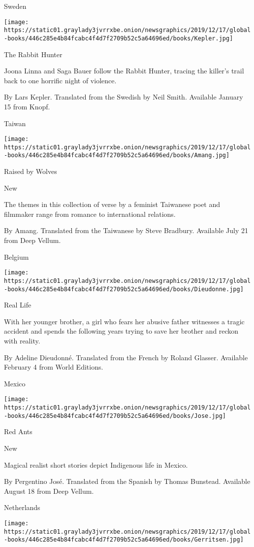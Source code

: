 Sweden

\texttt{[image: https://static01.graylady3jvrrxbe.onion/newsgraphics/2019/12/17/global-books/446c285e4b84fcabc4f4d7f2709b52c5a64696ed/books/Kepler.jpg]}

The Rabbit Hunter

Joona Linna and Saga Bauer follow the Rabbit Hunter, tracing the
killer's trail back to one horrific night of violence.

 By Lars Kepler. Translated from the Swedish by Neil Smith. Available
January 15 from Knopf.

Taiwan

\texttt{[image: https://static01.graylady3jvrrxbe.onion/newsgraphics/2019/12/17/global-books/446c285e4b84fcabc4f4d7f2709b52c5a64696ed/books/Amang.jpg]}

Raised by Wolves

New

The themes in this collection of verse by a feminist Taiwanese poet and
filmmaker range from romance to international relations.

 By Amang. Translated from the Taiwanese by Steve Bradbury. Available
July 21 from Deep Vellum.

Belgium

\texttt{[image: https://static01.graylady3jvrrxbe.onion/newsgraphics/2019/12/17/global-books/446c285e4b84fcabc4f4d7f2709b52c5a64696ed/books/Dieudonne.jpg]}

Real Life

With her younger brother, a girl who fears her abusive father witnesses
a tragic accident and spends the following years trying to save her
brother and reckon with reality.

 By Adeline Dieudonné. Translated from the French by Roland Glasser.
Available February 4 from World Editions.

Mexico

\texttt{[image: https://static01.graylady3jvrrxbe.onion/newsgraphics/2019/12/17/global-books/446c285e4b84fcabc4f4d7f2709b52c5a64696ed/books/Jose.jpg]}

Red Ants

New

Magical realist short stories depict Indigenous life in Mexico.

 By Pergentino José. Translated from the Spanish by Thomas Bunstead.
Available August 18 from Deep Vellum.

Netherlands

\texttt{[image: https://static01.graylady3jvrrxbe.onion/newsgraphics/2019/12/17/global-books/446c285e4b84fcabc4f4d7f2709b52c5a64696ed/books/Gerritsen.jpg]}

